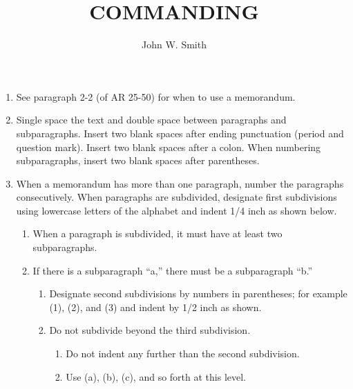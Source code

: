 \documentclass[digsig]{../armymemo}
\author{John W. Smith}\rank{CPT}\branch{CY}
\title{COMMANDING}                                                %
\begin{document}
\begin{enumerate}
	\item See paragraph 2-2 (of AR 25-50) for when to use a memorandum.
	\item Single space the text and double space between paragraphs and subparagraphs. Insert two blank spaces after ending punctuation (period and question mark). Insert two blank spaces after a colon. When numbering subparagraphs, insert two blank spaces after parentheses.
	\item When a memorandum has more than one paragraph, number the paragraphs consecutively. When paragraphs are subdivided, designate first subdivisions using lowercase letters of the alphabet and indent 1/4 inch as shown below.
	      \begin{enumerate}
		      \item When a paragraph is subdivided, it must have at least two subparagraphs.
		      \item If there is a subparagraph ``a,'' there must be a subparagraph ``b.''
		            \begin{enumerate}
			            \item Designate second subdivisions by numbers in parentheses; for example (1), (2), and (3) and indent by 1/2 inch as shown.
			            \item Do not subdivide beyond the third subdivision.
			                  \begin{enumerate}
				                  \item Do not indent any further than the second subdivision.
				                  \item Use (a), (b), (c), and so forth at this level.
			                  \end{enumerate}
		            \end{enumerate}
	      \end{enumerate}
\end{enumerate}
\end{document}
